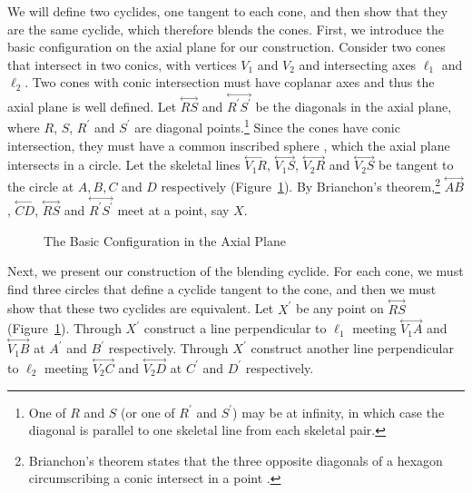We will define two cyclides, one tangent to each cone, and then show that
they are the same cyclide, which therefore blends the cones.
First, we introduce the basic configuration on the axial plane for our
construction.
Consider two cones that intersect in two conics, with vertices $V_1$ and
$V_2$ and intersecting axes $\ell_1$ and $\ell_2$.
Two cones with conic intersection must have coplanar axes 
\cite{shene-johnstone:1991a}
and thus the axial plane is well defined.
Let $\stackrel{\longleftrightarrow}{RS}$ and 
$\stackrel{\longleftrightarrow}{R^\prime S^\prime}$ be the diagonals in the 
axial plane, where $R$, $S$, $R^\prime$ and $S^\prime$ are diagonal 
points.\footnote{One of $R$ and $S$ (or one of $R^\prime$ and $S^\prime$)
	may be at infinity, in which case the diagonal is parallel to one
	skeletal line from each skeletal pair.}
Since the cones have conic intersection, they must have a common inscribed
sphere \cite{shene-johnstone:1991a}, 
which the axial plane intersects in a circle.
Let the skeletal lines 
$\stackrel{\longleftrightarrow}{V_1R}$, $\stackrel{\longleftrightarrow}{V_1S}$,
$\stackrel{\longleftrightarrow}{V_2R}$ and 
$\stackrel{\longleftrightarrow}{V_2S}$ be tangent to the circle at $A, B, C$ 
and $D$ respectively (Figure~\ref{fig:int-config}).  By Brianchon's 
theorem,\footnote{Brianchon's theorem states that the 
	three opposite diagonals of a
	hexagon circumscribing a conic intersect in a point 
	\cite{johnson:1929}.}
$\stackrel{\longleftrightarrow}{AB}$, $\stackrel{\longleftrightarrow}{CD}$,
$\stackrel{\longleftrightarrow}{RS}$ and
$\stackrel{\longleftrightarrow}{R^\prime S^\prime}$ meet at a point, say $X$.

\begin{figure}
\vspace{6.5cm}
\caption{The Basic Configuration in the Axial Plane}
\label{fig:int-config}
\end{figure}

Next, we present our construction of the blending cyclide.
For each cone, we must find three circles that define a cyclide tangent
to the cone, and then we must show that these two cyclides are equivalent.
Let $X^\prime$ be any point on $\stackrel{\longleftrightarrow}{RS}$
(Figure~\ref{fig:int-config}).
Through $X^\prime$ construct a line perpendicular to $\ell_1$ 
meeting $\stackrel{\longleftrightarrow}{V_1A}$ and
$\stackrel{\longleftrightarrow}{V_1B}$ at $A^\prime$ and $B^\prime$
respectively.
Through $X^\prime$ construct another line perpendicular to $\ell_2$ 
meeting $\stackrel{\longleftrightarrow}{V_2C}$ and
$\stackrel{\longleftrightarrow}{V_2D}$ at $C^\prime$ and $D^\prime$
respectively.


